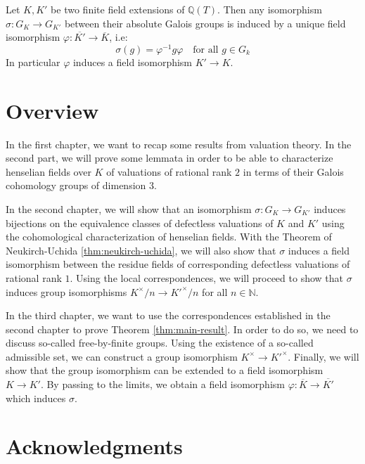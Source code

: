 \pagebreak

\begin{theorem}\label{thm:main-result}
Let $K,K'$ be two finite field extensions of $\mathbb{Q}(T)$. Then any isomorphism $\sigma:G_K\to G_{K'}$ between their absolute Galois groups is induced by a unique field isomorphism $\varphi:\overline{K'}\to\overline{K}$, i.e: 
\[\sigma(g) =\varphi^{-1}g\varphi \quad \text{for all }g\in G_k\]
In particular $\varphi$ induces a field isomorphism $K'\to K$.
\end{theorem}

\section{Overview}

In the first chapter, we want to recap some results from valuation theory. In the second part, we will prove some lemmata in order to be able to characterize henselian fields over $K$ of valuations of rational rank $2$ in terms of their Galois cohomology groups of dimension $3$.

In the second chapter, we will show that an isomorphism $\sigma: G_K\to G_{K'}$ induces bijections on the equivalence classes of defectless valuations of $K$ and $K'$ using the cohomological characterization of henselian fields. With the Theorem of Neukirch-Uchida \ref{thm:neukirch-uchida}, we will also show that $\sigma$ induces a field isomorphism between the residue fields of corresponding defectless valuations of rational rank $1$. Using the local correspondences, we will proceed to show that $\sigma$ induces group isomorphisms $K^\times/n\to K'^\times/n$ for all $n\in\mathbb{N}$.

In the third chapter, we want to use the correspondences established in the second chapter to prove Theorem \ref{thm:main-result}. In order to do so, we need to discuss so-called free-by-finite groups. Using the existence of a so-called admissible set, we can construct a group isomorphism $K^\times\to K'^\times$. Finally, we will show that the group isomorphism can be extended to a field isomorphism $K\to K'$. By passing to the limits, we obtain a field isomorphism $\varphi: \overline{K}\to\overline{K'}$ which induces $\sigma$.

\section{Acknowledgments}

\clearpage

